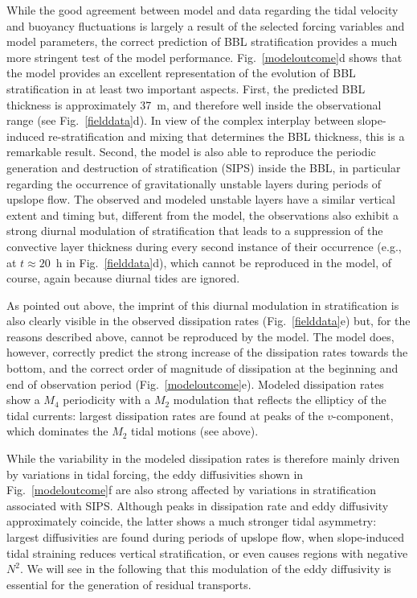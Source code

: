 While the good agreement between model and data regarding the tidal
velocity and buoyancy fluctuations is largely a result of the selected
forcing variables and model parameters, the correct prediction of BBL
stratification provides a much more stringent test of the model
performance. Fig.\ \ref{modeloutcome}d shows that the model provides
an excellent representation of the evolution of BBL stratification in
at least two important aspects. First, the predicted BBL thickness is
approximately 37~m, and therefore well inside the observational range
(see Fig.\ \ref{fielddata}d). In view of the complex interplay between
slope-induced re-stratification and mixing that determines the BBL
thickness, this is a remarkable result. Second, the model is also able
to reproduce the periodic generation and destruction of stratification
(SIPS) inside the BBL, in particular regarding the occurrence of
gravitationally unstable layers during periods of upslope flow. The
observed and modeled unstable layers have a similar vertical extent
and timing but, different from the model, the observations also
exhibit a strong diurnal modulation of stratification that leads to a
suppression of the convective layer thickness during every second
instance of their occurrence (e.g., at $t \approx 20$~h in
Fig.\ \ref{fielddata}d), which cannot be reproduced in the model, of course,
again because diurnal tides are ignored.

As pointed out above, the imprint of this diurnal modulation in
stratification is also clearly visible in the observed dissipation
rates (Fig.\ \ref{fielddata}e) but, for the reasons described above,
cannot be reproduced by the model. The model does, however, correctly
predict the strong increase of the dissipation rates towards the
bottom, and the correct order of magnitude of dissipation at the
beginning and end of observation period (Fig.\ \ref{modeloutcome}e). Modeled
dissipation rates show a $M_4$ periodicity with a $M_2$ modulation
that reflects the ellipticy of the tidal currents: largest dissipation
rates are found at peaks of the $v$-component, which dominates the
$M_2$ tidal motions (see above).

While the variability in the modeled dissipation rates is therefore
mainly driven by variations in tidal forcing, the eddy diffusivities
shown in Fig.\ \ref{modeloutcome}f are also strong affected by
variations in stratification associated with SIPS. Although peaks in
dissipation rate and eddy diffusivity approximately coincide, the
latter shows a much stronger tidal asymmetry: largest diffusivities
are found during periods of upslope flow, when slope-induced tidal
straining reduces vertical stratification, or even causes regions with
negative $N^2$. We will see in the following that this modulation of
the eddy diffusivity is essential for the generation of residual
transports.



